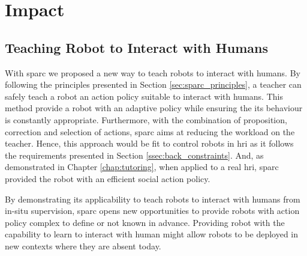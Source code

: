
\section{Impact} \label{sec:disc_impact}

\subsection{Teaching Robot to Interact with Humans}

With \gls{sparc} we proposed a new way to teach robots to interact with humans. By following the principles presented in Section \ref{sec:sparc_principles}, a teacher can safely teach a robot an action policy suitable to interact with humans. This method provide a robot with an adaptive policy while ensuring the its behaviour is constantly appropriate. Furthermore, with the combination of proposition, correction and selection of actions, \gls{sparc} aims at reducing the workload on the teacher. Hence, this approach would be fit to control robots in \gls{hri} as it follows the requirements presented in Section \ref{ssec:back_constraints}. And, as demonstrated in Chapter \ref{chap:tutoring}, when applied to a real \gls{hri}, \gls{sparc} provided the robot with an efficient social action policy. 

By demonstrating its applicability to teach robots to interact with humans from in-situ supervision, \gls{sparc} opens new opportunities to provide robots with action policy complex to define or not known in advance. Providing robot with the capability to learn to interact with human might allow robots to be deployed in new contexts where they are absent today.

